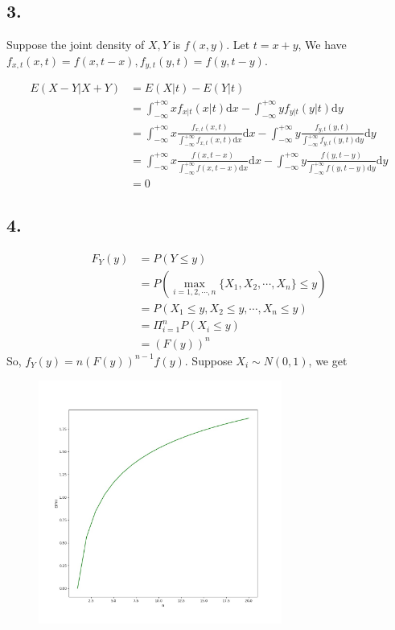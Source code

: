 \documentclass{article}
\begin{document}
\subsection*{3.}


Suppose the joint density of $X,Y$ is $f(x,y)$. Let $t=x+y$, We have $f_{x,t}(x,t)=f(x,t-x), f_{y,t}(y,t)=f(y,t-y)$.

\begin{align*}
E(X-Y|X+Y)&=E(X|t)-E(Y|t)\\
&=\int_{-\infty}^{+\infty}xf_{x|t}(x|t)\mathrm{d}x-\int_{-\infty}^{+\infty}yf_{y|t}(y|t)\mathrm{d}y\\
&=\int_{-\infty}^{+\infty}x\frac{f_{x,t}(x,t)}{\int_{-\infty}^{+\infty}f_{x,t}(x,t)\mathrm{d}x}\mathrm{d}x-\int_{-\infty}^{+\infty}y\frac{f_{y,t}(y,t)}{\int_{-\infty}^{+\infty}f_{y,t}(y,t)\mathrm{d}y}\mathrm{d}y\\
&=\int_{-\infty}^{+\infty}x\frac{f(x,t-x)}{\int_{-\infty}^{+\infty}f(x,t-x)\mathrm{d}x}\mathrm{d}x-\int_{-\infty}^{+\infty}y\frac{f(y,t-y)}{\int_{-\infty}^{+\infty}f(y,t-y)\mathrm{d}y}\mathrm{d}y\\
&=0
\end{align*}

\subsection*{4.}
\begin{align*}
F_{Y}(y)&=P(Y\leq y)\\
&=P(\max_{i=1,2,\cdots,n}\{X_{1},X_{2},\cdots,X_{n}\}\leq y)\\
&=P(X_{1}\leq y,X_{2}\leq y,\cdots,X_{n}\leq y)\\
&=\Pi_{i=1}^{n}P(X_{i}\leq y)\\
&=(F(y))^{n}
\end{align*}
So, $f_{Y}(y)=n(F(y))^{n-1}f(y)$. Suppose $X_{i}\sim N(0,1)$, we get
\begin{figure}[!h]
  \centering
  \includegraphics[width=8cm]{STT886Homework3.jpg}\\
\end{figure}
\end{document}
